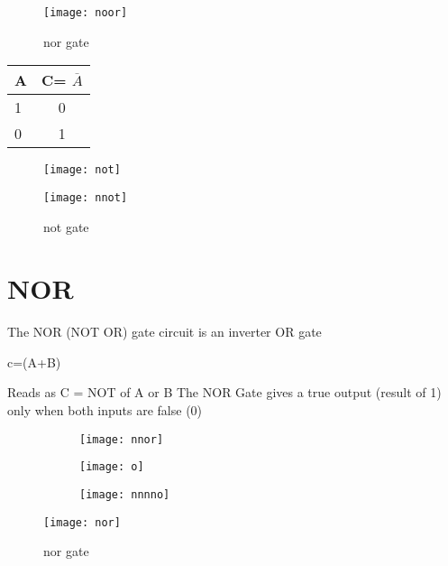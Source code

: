 \documentclass{article}
\begin{document}
	\begin{figure}[h!]
	\texttt{[image: noor]}
	\caption{nor gate}
	
	
\end{figure}
\begin{table}[h!]
	\begin{center}
		\begin{tabular}{|l|c}
			\cellcolor{blue!35}\textbf{A} &  \cellcolor{blue!35}\textbf{C= $\overline{A}$ }\\
			\hline
			\cellcolor{blue!15}	1 & \cellcolor{blue!15}0\\
			\cellcolor{blue!15}	0 & \cellcolor{blue!15}1 \\
			\hline	
		\end{tabular}
	\end{center}
\end{table}

	\begin{figure}[h!]
	\texttt{[image: not]}
\end{figure}
\begin{figure}[h!]
\texttt{[image: nnot]}
\caption{not gate}
\end{figure}
\section{NOR}

The NOR (NOT OR) gate circuit is an inverter OR gate
\begin{center}
	c=(A+B)
\end{center}
Reads as C = NOT of A or B
The NOR Gate gives a true output (result of 1) only when both inputs are false (0)

\begin{figure}[h!]
	\centering
	\begin{subfigure}[h!]{0.2\linewidth}
		
		\texttt{[image: nnor]} \end{subfigure}
	\begin{subfigure}[h!]{0.2\linewidth}
		\texttt{[image: o]}
	\end{subfigure}
	\begin{subfigure}[h!]{0.2\linewidth}
		\texttt{[image: nnnno]}
	\end{subfigure}
\end{figure}

\begin{figure}[h!]
\texttt{[image: nor]}
\caption{nor gate}
\end{figure}
\end{document}
